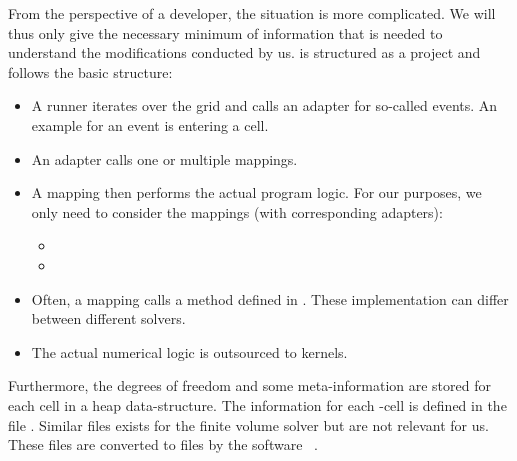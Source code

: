From the perspective of a developer, the situation is more complicated.
We will thus only give the necessary minimum of information that is needed to understand the modifications conducted by us.
\exahype{} is structured as a \peano{} project and follows the basic structure:
\begin{itemize}
\item A runner iterates over the grid and calls an adapter for so-called events.
  An example for an event is entering a cell.
\item An adapter calls one or multiple mappings.
\item A mapping then performs the actual program logic.
  For our purposes, we only need to consider the mappings (with corresponding adapters):
  \begin{itemize}
  \item {}
  \item {}
  \end{itemize}
\item Often, a mapping calls a method defined in .
  These implementation can differ between different solvers.
\item The actual numerical logic is outsourced to kernels.
\end{itemize}
Furthermore, the degrees of freedom and some meta-information are stored for each cell in a heap data-structure.
The information for each \dg{}-cell is defined in the file .
Similar files exists for the finite volume solver but are not relevant for us.
These files are converted to \cpp{} files by the software ~\cite{bungartz2008dastgen}.

